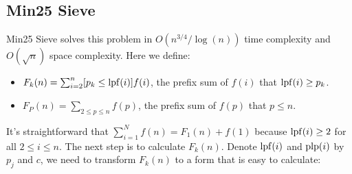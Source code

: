 \subsection{Min25 Sieve}
\allowdisplaybreaks
Min25 Sieve solves this problem in $O(n^{3/4}/\log(n))$ time complexity and $O(\sqrt{n})$ space complexity. Here we define:
\begin{itemize}
  \item $F_k(n)=\sum_{i=2}^n[p_k\le\mathop{\rm lpf}(i)] f(i)$, the prefix sum of $f(i)$ that $\mathop{\rm lpf}(i)\ge p_k$.
  \item $F_P(n)=\sum_{2\le p\le n} f(p)$, the prefix sum of $f(p)$ that $p\le n$.
\end{itemize}
It's straightforward that $\sum_{i=1}^N f(n)=F_1(n)+f(1)$ because $\mathop{\rm lpf}(i)\ge 2$ for all $2\le i\le n$. The next step is to calculate $F_k(n)$. Denote $\mathop{\rm lpf}(i)$ and $\mathop{\rm plp}(i)$ by $p_j$ and $c$, we need to transform $F_k(n)$ to a form that is easy to calculate:
